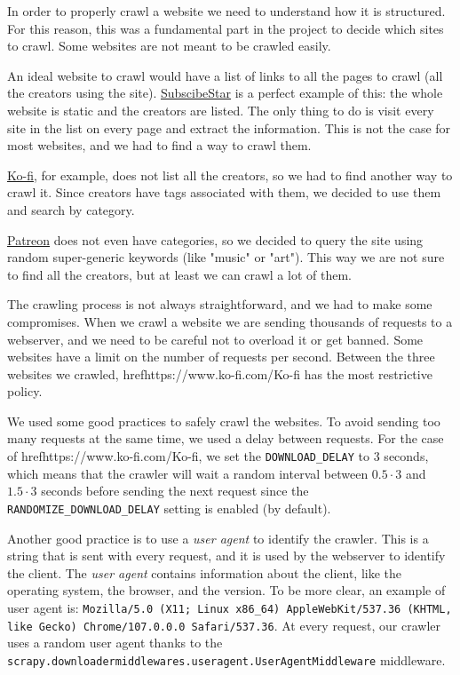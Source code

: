 \documentclass[tikz,14pt]{article}
\begin{document}
In order to properly crawl a website we need to understand how it is structured.
For this reason, this was a fundamental part in the project to decide which sites to crawl.
Some websites are not meant to be crawled easily.

An ideal website to crawl would have a list of links to all the pages to crawl (all the creators using the site).
\href{https://www.subscribestar.com/stars?_page=true&page=1}{SubscibeStar} is a perfect example of this:
the whole website is static and the creators are listed. 
The only thing to do is visit every site in the list on every page and extract the information.
This is not the case for most websites, and we had to find a way to crawl them.


\href{https://www.ko-fi.com/}{Ko-fi}, for example, does not list all the creators, so we had to find another way to crawl it.
Since creators have tags associated with them, we decided to use them and search by category.

\href{https://www.patreon.com/}{Patreon} does not even have categories, 
so we decided to query the site using random super-generic keywords (like "music" or "art").
This way we are not sure to find all the creators, but at least we can crawl a lot of them.

The crawling process is not always straightforward, and we had to make some compromises.
When we crawl a website we are sending thousands of requests to a webserver, and we need to be careful not to overload it or get banned.
Some websites have a limit on the number of requests per second.
Between the three websites we crawled, href{https://www.ko-fi.com/}{Ko-fi} has the most restrictive policy.

We used some good practices to safely crawl the websites. To avoid sending too many requests at the same time, we used a delay between requests.
For the case of href{https://www.ko-fi.com/}{Ko-fi}, we set the \verb|DOWNLOAD_DELAY| to 3 seconds, 
which means that the crawler will wait a random interval between $0.5 \cdot 3$ and $1.5 \cdot 3$ seconds 
before sending the next request since the \verb|RANDOMIZE_DOWNLOAD_DELAY| setting is enabled (by default).

Another good practice is to use a \textit{user agent} to identify the crawler.
This is a string that is sent with every request, and it is used by the webserver to identify the client.
The \textit{user agent} contains information about the client, like the operating system, the browser, and the version.
To be more clear, an example of user agent is: 
\verb|Mozilla/5.0 (X11; Linux x86_64) AppleWebKit/537.36 (KHTML, like Gecko) Chrome/107.0.0.0 Safari/537.36|.
At every request, our crawler uses a random user agent thanks to the \verb|scrapy.downloadermiddlewares.useragent.UserAgentMiddleware| middleware.
\end{document}
